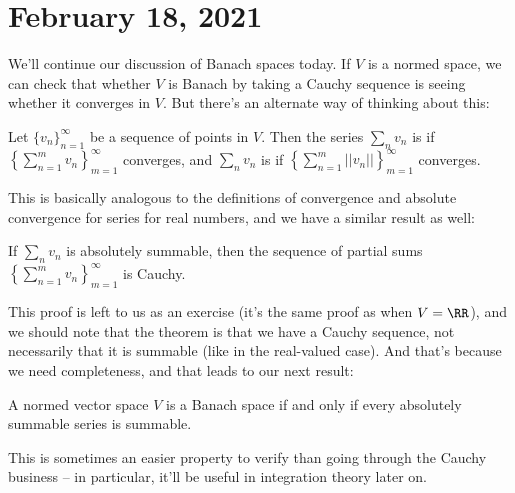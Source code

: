 
\pagebreak\section*{February 18, 2021}

We'll continue our discussion of Banach spaces today. If $V$ is a normed space, we can check that whether $V$ is Banach by taking a Cauchy sequence is seeing whether it converges in $V$. But there's an alternate way of thinking about this:

\begin{definition}
Let $\{v_n\}_{n=1}^{\infty}$ be a sequence of points in $V$. Then the series $\sum_{n} v_n$ is  if $\left\{\sum_{n=1}^m v_n\right\}_{m=1}^{\infty}$ converges, and $\sum_n v_n$ is  if $\left\{\sum_{n=1}^m ||v_n||\right\}_{m=1}^{\infty}$ converges.
\end{definition}

This is basically analogous to the definitions of convergence and absolute convergence for series for real numbers, and we have a similar result as well:

\begin{proposition}
If $\sum_n v_n$ is absolutely summable, then the sequence of partial sums $\left\{\sum_{n=1}^m v_n\right\}_{m=1}^{\infty}$ is Cauchy.
\end{proposition}

This proof is left to us as an exercise (it's the same proof as when $V = \RR$), and we should note that the theorem is that we have a Cauchy sequence, not necessarily that it is summable (like in the real-valued case). And that's because we need completeness, and that leads to our next result:

\begin{theorem}\label{summabilitybanach}
A normed vector space $V$ is a Banach space if and only if every absolutely summable series is summable.
\end{theorem}

This is sometimes an easier property to verify than going through the Cauchy business -- in particular, it'll be useful in integration theory later on.

